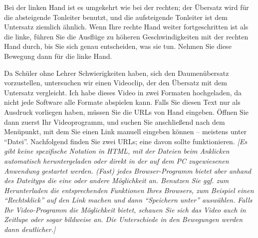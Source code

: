 Bei der linken Hand ist es umgekehrt wie bei der rechten; der Übersatz wird für die absteigende Tonleiter benutzt, und die aufsteigende Tonleiter ist dem Untersatz ziemlich ähnlich.
Wenn Ihre rechte Hand weiter fortgeschritten ist als die linke, führen Sie die Ausflüge zu höheren Geschwindigkeiten mit der rechten Hand durch, bis Sie sich genau entscheiden, was sie tun.
Nehmen Sie diese Bewegung dann für die linke Hand.

Da Schüler ohne Lehrer Schwierigkeiten haben, sich den Daumenübersatz vorzustellen, untersuchen wir einen Videoclip, der den Übersatz mit dem Untersatz vergleicht.
Ich habe dieses Video in zwei Formaten hochgeladen, da nicht jede Software alle Formate abspielen kann.
Falls Sie diesen Text nur als Ausdruck vorliegen haben, müssen Sie die URLs von Hand eingeben.
Öffnen Sie dann zuerst Ihr Videoprogramm, und suchen Sie anschließend nach dem Menüpunkt, mit dem Sie einen Link manuell eingeben können -- meistens unter \enquote{Datei}.
Nachfolgend finden Sie zwei URLs; eine davon sollte funktionieren.
\textit{[Es gibt keine spezifische Notation in HTML, mit der Dateien beim Anklicken automatisch heruntergeladen oder direkt in der auf dem PC zugewiesenen Anwendung gestartet werden.
(Fast) jedes Browser-Programm bietet aber anhand des Dateityps die eine oder andere Möglichkeit an.
Benutzen Sie ggf. zum Herunterladen die entsprechenden Funktionen Ihres Browsers, zum Beispiel einen \enquote{Rechtsklick} auf den Link machen und dann \enquote{Speichern unter} auswählen.
Falls Ihr Video-Programm die Möglichkeit bietet, schauen Sie sich das Video auch in Zeitlupe oder sogar bildweise an.  Die Unterschiede in den Bewegungen werden dann deutlicher.]}

